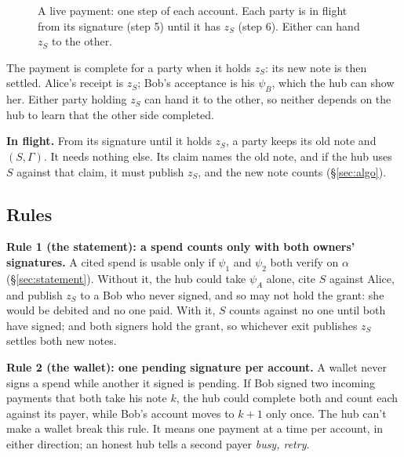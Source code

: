 \documentclass[11pt]{article}
\theoremstyle{plain}
\theoremstyle{definition}
\newcommand{\Compl}{\mathsf{Complete}}
\begin{document}
\begin{figure}[!tbp]
\caption{A live payment: one step of each account. Each party is in
flight from its signature (step 5) until it has $z_S$ (step 6). Either
can hand $z_S$ to the other.}
\label{fig:payment}
\end{figure}

The payment is complete for a party when it holds $z_S$: its new note
is then settled. Alice's receipt is $z_S$; Bob's acceptance is his
$\psi_B$, which the hub can show her. Either party holding $z_S$ can
hand it to the other, so neither depends on the hub to learn that the
other side completed.

\textbf{In flight.} From its signature until it holds $z_S$, a party
keeps its old note and $(S, \Gamma)$. It needs nothing else. Its claim
names the old note, and if the hub uses $S$ against that claim, it must
publish $z_S$, and the new note counts (\S\ref{sec:algo}).

\subsection{Rules}\label{sec:rules}

\textbf{Rule 1 (the statement): a spend counts only with both owners'
signatures.} A cited spend is usable only if $\psi_1$ and $\psi_2$ both
verify on $\alpha$ (\S\ref{sec:statement}). Without it, the hub could
take $\psi_A$ alone, cite $S$ against Alice, and publish $z_S$ to a Bob
who never signed, and so may not hold the grant: she would be debited
and no one paid. With it, $S$ counts against no one until both have
signed; and both signers hold the grant, so whichever exit publishes
$z_S$ settles both new notes.

\textbf{Rule 2 (the wallet): one pending signature per account.} A
wallet never signs a spend while another it signed is pending. If Bob
signed two incoming payments that both take his note $k$, the hub could
complete both and count each against its payer, while Bob's account
moves to $k+1$ only once. The hub can't make a wallet break this rule.
It means one payment at a time per account, in either direction; an
honest hub tells a second payer \emph{busy, retry}.
\end{document}
